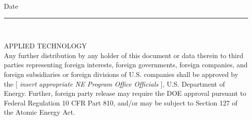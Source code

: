 {{\begin{minipage}[t]{0.645\textwidth}
{{    
    Date \underline{}}} \\
\rule{85mm}{.3pt}\\
    \vspace{3pt}
    \raggedright
    \textnormal{
    \hspace*{\fill} {APPLIED TECHNOLOGY \hspace*{\fill} \\
      Any further distribution by any holder of this document or data therein to third parties representing foreign interests, foreign governments, foreign companies, and foreign subsidiaries or foreign divisions of U.S. companies shall be approved by the [ \emph {insert appropriate NE Program Office Officials} ], U.S. Department of Energy.  Further, foreign party release may require the DOE approval pursuant to Federal Regulation 10 CFR Part 810, and/or may be subject to Section 127 of the Atomic Energy Act.\\ }}
    \end{minipage}
    }}
